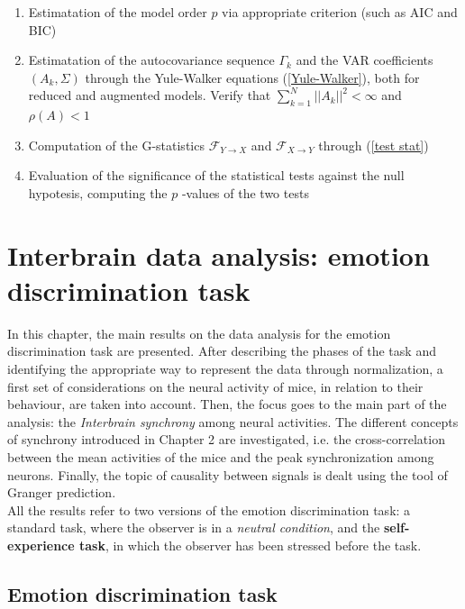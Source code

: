 \documentclass[12pt, a4paper]{report}
\begin{document}
\begin{enumerate}
	\item Estimatation of the model order $p$ via appropriate criterion (such as AIC and BIC)
	
	\item Estimatation of the autocovariance sequence $\Gamma_k$ and the VAR coefficients $(A_k, \Sigma)$ through the Yule-Walker equations (\ref{Yule-Walker}), both for reduced and augmented models. Verify that $ \sum_{k=1}^{N}||A_k||^2 < \infty $ and  $\rho(A) < 1$
	
	\item Computation of the G-statistics $ \mathcal{F}_{Y \rightarrow X} $ and $ \mathcal{F}_{X \rightarrow Y} $ through (\ref{test stat})
	
	\item Evaluation of the significance of the statistical tests against the null hypotesis, computing the $p$ -values of the two tests 
	
\end{enumerate}





\newpage
\chapter{Interbrain data analysis: emotion discrimination task}

In this chapter, the main results on the data analysis for the emotion discrimination task are presented. After describing the phases of the task and identifying the appropriate way  to represent the data through normalization, a first set of considerations on the neural activity of mice, in relation to their behaviour, are taken into account. Then, the focus goes to the main part of the analysis: the \textit{Interbrain synchrony} among neural activities. The different concepts of synchrony introduced in Chapter 2 are  investigated, i.e. the cross-correlation between the mean activities of the mice and the peak synchronization among neurons. Finally, the topic of causality between signals is dealt using the tool of Granger prediction.\\
All the results refer to two versions of the emotion discrimination task: a standard task, where the observer is in a \textit{neutral condition}, and the \textbf{self-experience task}, in which the observer has been stressed before the task.


\section{Emotion discrimination task}
\end{document}
